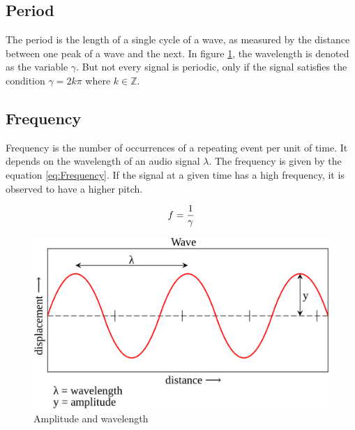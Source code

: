 \subsection{Period}
\label{sub:Period}

The period is the length of a single cycle of a wave, as measured by the distance between one peak of a wave and the next. In figure \ref{fig:Amplitude-Wavelenght}, the wavelength is denoted as the variable $\gamma$. But not every signal is periodic, only if the signal satisfies the condition $\gamma = 2k\pi$ where $k \in \mathbb{Z}$.

\subsection{Frequency}
\label{sub:Frequency}

Frequency is the number of occurrences of a repeating event per unit of time. It depends on the wavelength of an audio signal $\lambda$. The frequency is given by the equation \ref{eq:Frequency}. If the signal at a given time has a high frequency, it is observed to have a higher pitch.

\begin{equation}
    \centering
    f = \frac{1}{\gamma}
    \label{eq:Frequency}
\end{equation}

\begin{figure}[htbp]
	\centering
	\includegraphics[scale=0.25]{baa-documentation/img/Amplitude.png}
	\caption[Amplitude and wavelength illustrated]{Amplitude and wavelength \footnotemark}
	\label{fig:Amplitude-Wavelenght}
\end{figure}


